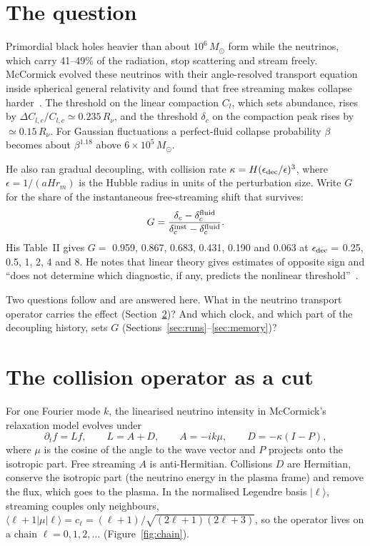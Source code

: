 \documentclass[11pt]{article}
\begin{document}
\begin{abstract}
\end{abstract}

\section{The question}

Primordial black holes heavier than about $10^6\,M_\odot$ form while the neutrinos, which carry 41--49\% of the radiation, stop scattering and stream freely. McCormick evolved these neutrinos with their angle-resolved transport equation inside spherical general relativity and found that free streaming makes collapse harder~\cite{McC}. The threshold on the linear compaction $C_l$, which sets abundance, rises by $\Delta C_{l,c}/C_{l,c}\simeq0.235\,R_\nu$, and the threshold $\delta_c$ on the compaction peak rises by $\simeq0.15\,R_\nu$. For Gaussian fluctuations a perfect-fluid collapse probability $\beta$ becomes about $\beta^{1.18}$ above $6\times10^5\,M_\odot$.

He also ran gradual decoupling, with collision rate $\kappa=H(\epsilon_{\rm dec}/\epsilon)^3$, where $\epsilon=1/(aHr_m)$ is the Hubble radius in units of the perturbation size. Write $G$ for the share of the instantaneous free-streaming shift that survives:
\begin{equation}
G=\frac{\delta_c-\delta_c^{\rm fluid}}{\delta_c^{\rm inst}-\delta_c^{\rm fluid}}.
\end{equation}
His Table~II gives $G=$ 0.959, 0.867, 0.683, 0.431, 0.190 and 0.063 at $\epsilon_{\rm dec}=$ 0.25, 0.5, 1, 2, 4 and 8. He notes that linear theory gives estimates of opposite sign and ``does not determine which diagnostic, if any, predicts the nonlinear threshold''~\cite[Sec.~IV\,C]{McC}.

Two questions follow and are answered here. What in the neutrino transport operator carries the effect (Section~\ref{sec:cut})? And which clock, and which part of the decoupling history, sets $G$ (Sections~\ref{sec:runs}--\ref{sec:memory})?

\section{The collision operator as a cut}\label{sec:cut}

For one Fourier mode $k$, the linearised neutrino intensity in McCormick's relaxation model evolves under
\begin{equation}
\partial_t f=L f,\qquad L=A+D,\qquad A=-ik\mu,\qquad D=-\kappa(I-P),
\end{equation}
where $\mu$ is the cosine of the angle to the wave vector and $P$ projects onto the isotropic part. Free streaming $A$ is anti-Hermitian. Collisions $D$ are Hermitian, conserve the isotropic part (the neutrino energy in the plasma frame) and remove the flux, which goes to the plasma. In the normalised Legendre basis $|\ell\rangle$, streaming couples only neighbours, $\langle\ell+1|\mu|\ell\rangle=c_\ell=(\ell+1)/\sqrt{(2\ell+1)(2\ell+3)}$, so the operator lives on a chain $\ell=0,1,2,\dots$ (Figure~\ref{fig:chain}).
\end{document}
